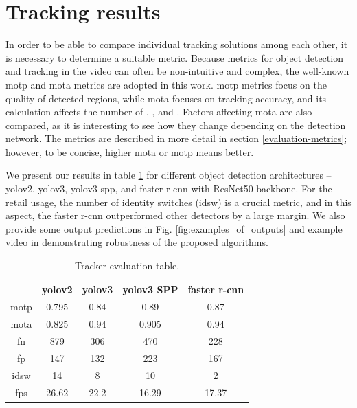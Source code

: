 \section{Tracking results}
    In order to be able to compare individual tracking solutions among each other, it is necessary to determine a suitable metric. Because metrics for object detection and tracking in the video can often be non-intuitive and complex, the well-known \gls{motp} and \gls{mota} metrics are adopted in this work. \gls{motp} metrics focus on the quality of detected regions, while \gls{mota} focuses on tracking accuracy, and its calculation affects the number of , , and . Factors affecting \gls{mota} are also compared, as it is interesting to see how they change depending on the detection network. The metrics are described in more detail in section \ref{evaluation-metrics}; however, to be concise, higher \gls{mota} or \gls{motp} means better.
    
    We present our results in table \ref{table:tracking_results} for different object detection architectures -- \gls{yolo}v2, \gls{yolo}v3, \gls{yolo}v3 \gls{spp}, and \gls{faster r-cnn} with ResNet50 backbone. For the retail usage, the number of identity switches (\gls{idsw}) is a crucial metric, and in this aspect, the \gls{faster r-cnn} outperformed other detectors by a large margin. We also provide some output predictions in Fig. \ref{fig:examples_of_outputs} and example video in \cite{trackingvideo} demonstrating robustness of the proposed algorithms.  
    
    \begin{table}[h]
        \centering
        \begin{tabular}{|c|c|c|c|c|}
            \hline
            \rowcolor{Blue}
            \color{White}\textbf{} & \color{White}\textbf{\gls{yolo}v2} & \color{White}\textbf{\gls{yolo}v3} & \color{White}\textbf{\gls{yolo}v3 SPP} & \color{White}\textbf{\gls{faster r-cnn}} \\ \hline \hline
                \gls{motp} & 0.795 & 0.84 & 0.89 & 0.87 \\ \hline
                \gls{mota} & 0.825 & 0.94 & 0.905 & 0.94 \\ \hline
                \gls{fn} & 879 & 306 & 470 & 228 \\ \hline    
                \gls{fp} & 147 & 132 & 223 & 167 \\ \hline    
                \gls{idsw} & 14 & 8 & 10 & 2 \\ \hline
                \gls{fps}  & 26.62 & 22.2 & 16.29 & 17.37 \\ \hline    
        \end{tabular}
        \caption{Tracker evaluation table.}
        \label{table:tracking_results}
    \end{table}
    
